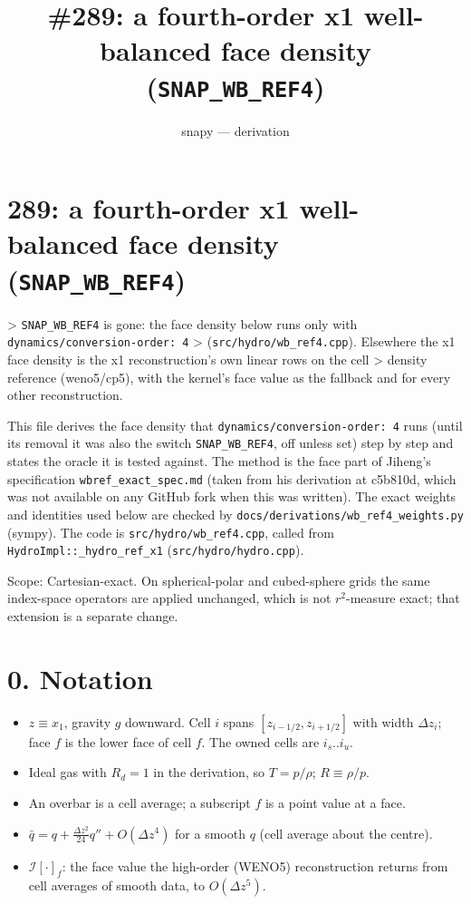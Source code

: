 \documentclass[11pt,a4paper]{article}
\title{\#289: a fourth-order x1 well-balanced face density (\texttt{SNAP\_WB\_REF4})}
\author{snapy --- derivation}\date{}
\begin{document}
\maketitle
\section*{289: a fourth-order x1 well-balanced face density (\texttt{SNAP\_WB\_REF4})}

> \texttt{SNAP\_WB\_REF4} is gone: the face density below runs only with \texttt{dynamics/conversion-order: 4}
> (\texttt{src/hydro/wb\_ref4.cpp}). Elsewhere the x1 face density is the x1 reconstruction's own linear rows on the cell
> density reference (weno5/cp5), with the kernel's face value as the fallback and for every other reconstruction.

This file derives the face density that \texttt{dynamics/conversion-order: 4} runs (until its removal it was also the switch
\texttt{SNAP\_WB\_REF4}, off unless set) step by step and states
the oracle it is tested against. The method is the face part of Jiheng's specification \texttt{wbref\_exact\_spec.md}
(taken from his derivation at c5b810d, which was not
available on any GitHub fork when this was written). The exact weights and identities used below are checked
by \texttt{docs/derivations/wb\_ref4\_weights.py} (sympy). The code is \texttt{src/hydro/wb\_ref4.cpp}, called from
\texttt{HydroImpl::\_hydro\_ref\_x1} (\texttt{src/hydro/hydro.cpp}).

Scope: Cartesian-exact. On spherical-polar and cubed-sphere grids the same index-space operators are applied
unchanged, which is not $r^2$-measure exact; that extension is a separate change.

\section*{0. Notation}

\begin{itemize}
\item $z \equiv x_1$, gravity $g$ downward. Cell $i$ spans $[z_{i-1/2}, z_{i+1/2}]$ with width $\Delta z_i$; face $f$
  is the lower face of cell $f$. The owned cells are $i_s..i_u$.
\item Ideal gas with $R_d = 1$ in the derivation, so $T = p/\rho$; $R \equiv \rho/p$.
\item An overbar is a cell average; a subscript $f$ is a point value at a face.
\item $\bar q = q + \tfrac{\Delta z^2}{24} q'' + O(\Delta z^4)$ for a smooth $q$ (cell average about the centre).
\item $\mathcal I[\cdot]_f$: the face value the high-order (WENO5) reconstruction returns from cell averages of
  smooth data, to $O(\Delta z^5)$.
\end{itemize}
\end{document}
